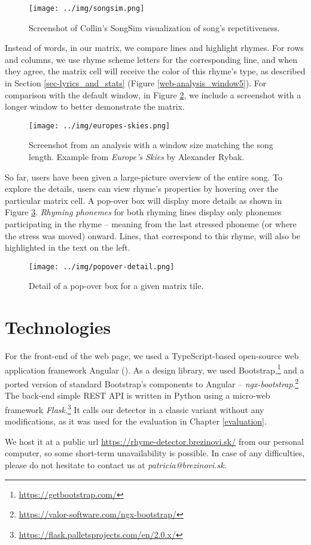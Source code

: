 \begin{figure}[h]\centering
	\texttt{[image: ../img/songsim.png]}
	\caption{Screenshot of Collin's SongSim visualization of song's repetitiveness.}
	\label{songsim}
\end{figure}

Instead of words, in our matrix, we compare lines and highlight rhymes. For rows and columns, we use rhyme scheme letters for the corresponding line, and when they agree, the matrix cell will receive the color of this rhyme's type, as described in Section \ref{sec-lyrics_and_stats} (Figure \ref{web-analysis_window5}). For comparison with the default window, in Figure \ref{web-analysis_window_all}, we include a screenshot with a longer window to better demonstrate the matrix.


\begin{figure}[!h]\centering
		\texttt{[image: ../img/europes-skies.png]}
	\caption[Screenshot from an analysis with a window size matching the song length.]{Screenshot from an analysis with a window size matching the song length. Example from \textit{Europe's Skies} by Alexander Rybak.}
	\label{web-analysis_window_all}
\end{figure}

So far, users have been given a large-picture overview of the entire song. To explore the details, users can view rhyme's properties by hovering over the particular matrix cell. A pop-over box will display more details as shown in Figure \ref{web-popover}. \textit{Rhyming phonemes} for both rhyming lines display only phonemes participating in the rhyme -- meaning from the last stressed phoneme (or where the stress was moved) onward. Lines, that correspond to this rhyme, will also be highlighted in the text on the left. 

\begin{figure}[h]\centering
		\texttt{[image: ../img/popover-detail.png]}
	\caption{Detail of a pop-over box for a given matrix tile.}
	\label{web-popover}
\end{figure}


\section{Technologies}
For the front-end of the web page, we used a TypeScript-based open-source web application framework Angular (\cite{angular}). As a design library, we used Bootstrap,\footnote{\url{https://getbootstrap.com/}} and a ported version of standard Bootstrap's components to Angular -- \textit{ngx-bootstrap}.\footnote{\url{https://valor-software.com/ngx-bootstrap/}} The back-end simple REST API is written in Python using a micro-web framework \textit{Flask}.\footnote{\url{https://flask.palletsprojects.com/en/2.0.x/}} It calls our detector in a classic variant without any modifications, as it was used for the evaluation in Chapter \ref{evaluation}. 

We host it at a public url \url{https://rhyme-detector.brezinovi.sk/} from our personal computer, so some short-term unavailability is possible. In case of any difficulties, please do not hesitate to contact us at \textit{patricia@brezinovi.sk}.
